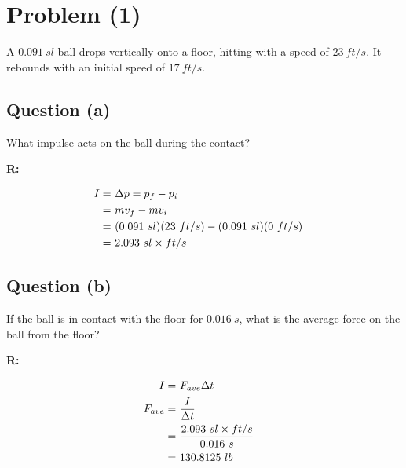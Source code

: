 \section{Problem (1)}
	A $0.091 \ sl$ ball drops vertically onto a floor, hitting with a speed of $23 \ ft/s$. It rebounds with an initial speed of $17 \ ft/s$.

	\subsection{Question (a)}

		What impulse acts on the ball during the contact?

		\textbf{R:}

		\begin{align}
			I = \ &\Delta p = p_{f} - p_{i}& \notag \\
			= \ &mv_{f} - mv_{i}& \notag \\
			= \ &(0.091 \ sl)(23 \ ft/s) - (0.091 \ sl)(0 \ ft/s)& \notag \\
			= \ &2.093 \ sl \times ft/s&
		\end{align}

	\subsection{Question (b)}

		If the ball is in contact with the floor for $0.016 \ s$, what is the average force on the ball from the floor?

		\textbf{R:}

		\begin{align}
			I = \ &F_{ave}\Delta t& \notag \\
			F_{ave} = \ &\frac{I}{\Delta t}& \notag \\
			= \ &\frac{2.093 \ sl \times ft/s}{0.016 \ s}& \notag \\
			= \ &130.8125 \ lb&
		\end{align}
